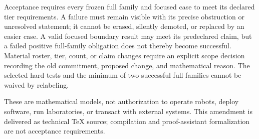 \documentclass[11pt,a4paper]{article}
\begin{document}
Acceptance requires every frozen full family and focused case to meet its
declared tier requirements. A failure must remain visible with its precise
obstruction or unresolved statement; it cannot be erased, silently demoted,
or replaced by an easier case. A valid focused boundary result may meet its
predeclared claim, but a failed positive full-family obligation does not
thereby become successful. Material roster, tier, count, or claim changes
require an explicit scope decision recording the old commitment, proposed
change, and mathematical reason. The selected hard tests and the minimum
of two successful full families cannot be waived by relabeling.

These are mathematical models, not authorization to operate robots, deploy
software, run laboratories, or transact with external systems. This
amendment is delivered as technical TeX source; compilation and
proof-assistant formalization are not acceptance requirements.
\end{document}
